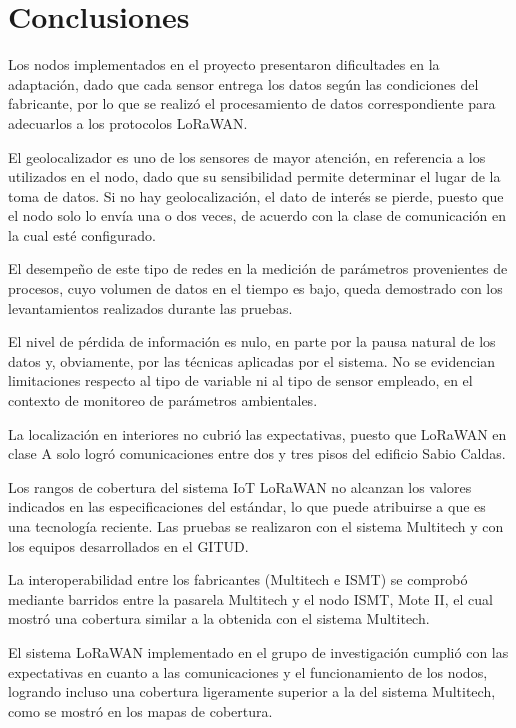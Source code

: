 
\chapter*{Conclusiones}

Los nodos implementados en el proyecto presentaron dificultades en la adaptación, dado que cada sensor entrega los datos según las condiciones del fabricante, por lo que se realizó el procesamiento de datos correspondiente para adecuarlos a los protocolos LoRaWAN.

El geolocalizador es uno de los sensores de mayor atención, en referencia a los utilizados en el nodo, dado que su sensibilidad permite determinar el lugar de la toma de datos. Si no hay geolocalización, el dato de interés se pierde, puesto que el nodo solo lo envía una o dos veces, de acuerdo con la clase de comunicación en la cual esté configurado.

El desempeño de este tipo de redes en la medición de parámetros provenientes de procesos, cuyo volumen de datos en el tiempo es bajo, queda demostrado con los levantamientos realizados durante las pruebas.

El nivel de pérdida de información es nulo, en parte por la pausa natural de los datos y, obviamente, por las técnicas aplicadas por el sistema. No se evidencian limitaciones respecto al tipo de variable ni al tipo de sensor empleado, en el contexto de monitoreo de parámetros ambientales.

La localización en interiores no cubrió las expectativas, puesto que LoRaWAN en clase A solo logró comunicaciones entre dos y tres pisos del edificio Sabio Caldas.

\enlargethispage{\baselineskip}

Los rangos de cobertura del sistema IoT LoRaWAN no alcanzan los valores indicados en las especificaciones del estándar, lo que puede atribuirse a que es una tecnología reciente. Las pruebas se realizaron con el sistema Multitech y con los equipos desarrollados en el GITUD.

La interoperabilidad entre los fabricantes (Multitech e ISMT) se comprobó mediante barridos entre la pasarela Multitech y el nodo ISMT, Mote II, el cual mostró una cobertura similar a la obtenida con el sistema Multitech.

El sistema LoRaWAN implementado en el grupo de investigación cumplió con las expectativas en cuanto a las comunicaciones y el funcionamiento de los nodos, logrando incluso una cobertura ligeramente superior a la del sistema Multitech, como se mostró en los mapas de cobertura.

